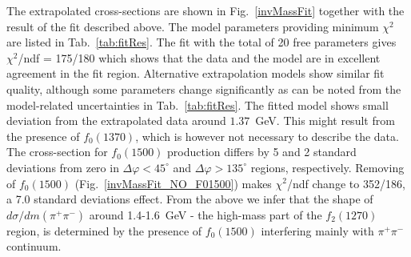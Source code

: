The extrapolated cross-sections are shown in Fig.~\ref{invMassFit} together with the result of the fit described above. The model parameters providing minimum $\chi^{2}$ are listed in Tab.~\ref{tab:fitRes}. The fit with the total of 20 free parameters gives $\chi^2$/ndf = 175/180 which shows that the data and the model are in excellent agreement in the fit region. Alternative extrapolation models show similar fit quality, although some parameters change significantly as can be noted from the model-related uncertainties in Tab.~\ref{tab:fitRes}.
The fitted model shows small deviation from the extrapolated data around $1.37$~GeV. This might result from the presence of $f_{0}(1370)$, which is however not necessary to describe the data. The cross-section for $f_0(1500)$ production differs by 5 and 2 standard deviations from zero in  $\Delta\varphi<45^\circ$ and $\Delta\varphi>135^\circ$ regions, respectively. Removing of $f_0(1500)$  (Fig.~\ref{invMassFit_NO_F01500}) makes $\chi^2$/ndf change to 352/186, a 7.0 standard deviations effect. From the above we infer that the shape of $d\sigma/dm(\pi^{+}\pi^{-})$ around 1.4-1.6~GeV - the high-mass part of the $f_{2}(1270)$ region, is determined by the presence of $f_0(1500)$ interfering mainly with $\pi^{+}\pi^{-}$ continuum.

